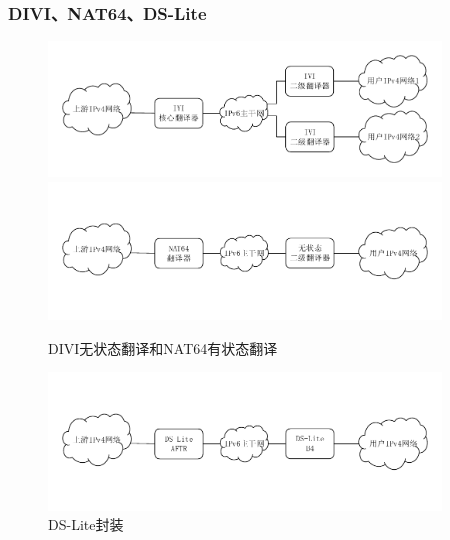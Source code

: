 \documentclass{beamer}
\begin{document}
\begin{frame}
  \frametitle{DIVI、NAT64、DS-Lite}

  \vspace{-1.5em}
  \begin{figure}
    \includegraphics[width=0.93\textwidth]{figs/5-divi.pdf}\\
    \vspace{-3.5em}
    \includegraphics[width=0.93\textwidth]{figs/7-nat64.pdf}\\
    \vspace{-4em}
    \caption{\tiny DIVI无状态翻译和NAT64有状态翻译}
    \vspace{-2em}
    \includegraphics[width=0.93\textwidth]{figs/8-ds-lite.pdf}
    \vspace{-4em}
    \caption{\tiny DS-Lite封装}
  \end{figure}
\end{frame}
\end{document}
